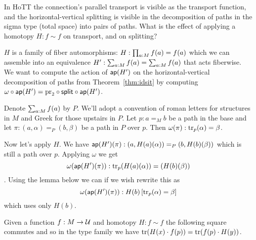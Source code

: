 \documentclass[12pt]{article}
\begin{document}
In HoTT the connection's parallel transport is visible as the transport function, and the horizontal-vertical splitting is visible in the decomposition of paths in the sigma type (total space) into pairs of paths. What is the effect of applying a homotopy \( H:f\sim f \) on transport, and on splitting?

\( H \) is a family of fiber automorphisms: \( H:\prod_{a:M}f(a)=f(a) \) which we can assemble into an equivalence \( H':\sum_{a:M}f(a)=\sum_{a:M}f(a) \) that acts fiberwise. We want to compute the action of \( \mathsf{ap}(H') \) on the horizontal-vertical decomposition of paths from Theorem~\ref{thm:idsit} by computing \( \omega\circ\mathsf{ap}(H')=\mathrm{pr}_2\circ\mathsf{split}\circ\mathsf{ap}(H') \).

Denote \( \sum_{a:M}f(a) \) by \( P \). We'll adopt a convention of roman letters for structures in \( M \) and Greek for those upstairs in \( P \). Let \( p:a=_M b \) be a path in the base and let \( \pi:(a,\alpha)=_P (b,\beta) \) be a path in \( P \) over \( p \). Then \( \omega(\pi):\mathrm{tr}_p(\alpha)=\beta \).

Now let's apply \( H \). We have \( \mathsf{ap}(H')(\pi):(a,H(a)(\alpha))=_P(b,H(b)(\beta)) \) which is still a path over \( p \). Applying \( \omega \) we get \[ \omega(\mathsf{ap}(H')(\pi)):\mathrm{tr}_p(H(a)(\alpha))=(H(b)(\beta)) \]. Using the lemma below we can if we wish rewrite this as 
\[ 
\omega(\mathsf{ap}(H')(\pi)):H(b)\left[\mathrm{tr}_p(\alpha)=\beta\right]
\]
which uses only \( H(b) \).

\begin{mylemma}
Given a function \( f:M\to\mathcal{U} \) and homotopy \( H:f\sim f \) the following square commutes and so in the type family we have \( \mathrm{tr}(H(x)\cdot f(p)) = \mathrm{tr}(f(p)\cdot H(y)) \).
\end{mylemma}
\begin{center}
\end{center}
\end{document}
